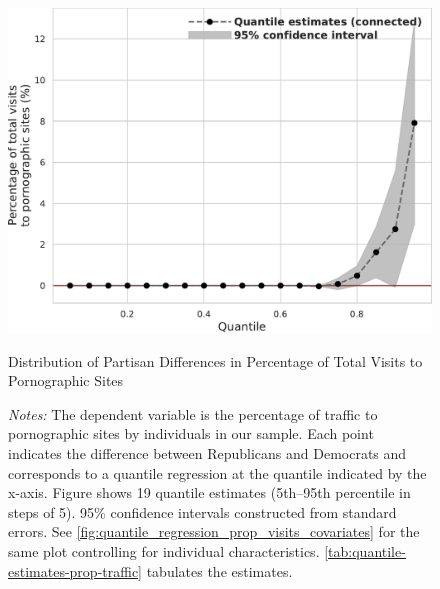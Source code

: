 \documentclass[12pt,twoside]{article}
\begin{document}
\begin{figure}
	\centering
	\includegraphics[width=.6\linewidth]{figs/quantile_reg_proportion_visits_adult.pdf}
	\caption{Distribution of Partisan Differences in Percentage of Total Visits to Pornographic Sites}
	\caption*{\footnotesize \emph{Notes:} 
		The dependent variable is the percentage of traffic to pornographic sites by individuals in our sample.
		Each point indicates the difference between Republicans and Democrats and corresponds to a quantile regression at the quantile indicated by the x-axis.
  Figure shows 19 quantile estimates (5th--95th percentile in steps of 5).
		95\% confidence intervals constructed from standard errors.
		See \cref{fig:quantile_regression_prop_visits_covariates} for the same plot controlling for individual characteristics.
            \cref{tab:quantile-estimates-prop-traffic} tabulates the estimates.
	}
	\label{fig:quantile_regression_prop_visits}
\end{figure}
\end{document}
